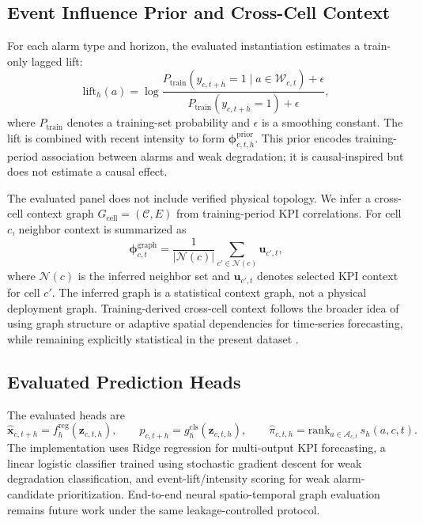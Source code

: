 \subsection{Event Influence Prior and Cross-Cell Context}
For each alarm type and horizon, the evaluated instantiation estimates a train-only lagged lift:
\begin{equation}
    \mathrm{lift}_h(a)=
    \log\frac{P_{\mathrm{train}}(y_{c,t+h}=1 \mid a \in \mathcal{W}_{c,t})+\epsilon}
    {P_{\mathrm{train}}(y_{c,t+h}=1)+\epsilon},
\end{equation}
where $P_{\mathrm{train}}$ denotes a training-set probability and $\epsilon$ is a smoothing constant. The lift is combined with recent intensity to form $\boldsymbol{\phi}^{\mathrm{prior}}_{c,t,h}$. This prior encodes training-period association between alarms and weak degradation; it is causal-inspired but does not estimate a causal effect.

The evaluated panel does not include verified physical topology. We infer a cross-cell context graph $G_{\mathrm{cell}}=(\mathcal{C},E)$ from training-period KPI correlations. For cell $c$, neighbor context is summarized as
\begin{equation}
    \boldsymbol{\phi}^{\mathrm{graph}}_{c,t}
    =\frac{1}{|\mathcal{N}(c)|}\sum_{c'\in\mathcal{N}(c)}\mathbf{u}_{c',t},
\end{equation}
where $\mathcal{N}(c)$ is the inferred neighbor set and $\mathbf{u}_{c',t}$ denotes selected KPI context for cell $c'$. The inferred graph is a statistical context graph, not a physical deployment graph. Training-derived cross-cell context follows the broader idea of using graph structure or adaptive spatial dependencies for time-series forecasting, while remaining explicitly statistical in the present dataset \cite{li2018dcrnn,wu2019graphwavenet}.

\subsection{Evaluated Prediction Heads}
The evaluated heads are
\begin{equation}
    \hat{\mathbf{x}}_{c,t+h}=f_h^{\mathrm{reg}}(\mathbf{z}_{c,t,h}),\qquad
    \hat{p}_{c,t+h}=g_h^{\mathrm{cls}}(\mathbf{z}_{c,t,h}),\qquad
    \widehat{\pi}_{c,t,h}=\mathrm{rank}_{a\in\mathcal{A}_{c,t}}\,s_h(a,c,t).
\end{equation}
The implementation uses Ridge regression for multi-output KPI forecasting, a linear logistic classifier trained using stochastic gradient descent for weak degradation classification, and event-lift/intensity scoring for weak alarm-candidate prioritization. End-to-end neural spatio-temporal graph evaluation remains future work under the same leakage-controlled protocol.


